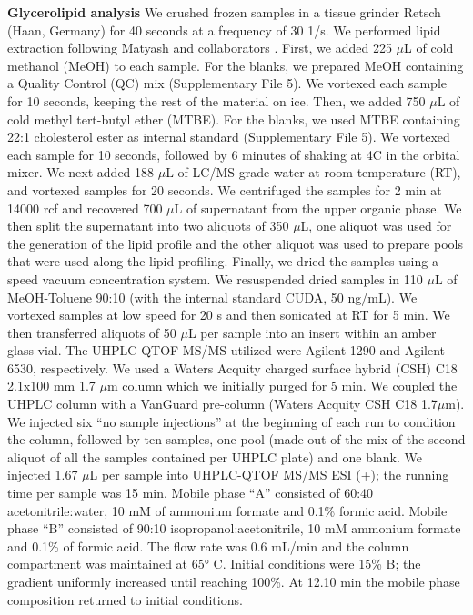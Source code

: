 \documentclass[9pt,twocolumn,twoside,lineno]{BioRxiv}
\begin{document}
\textbf{Glycerolipid analysis} 
We crushed frozen samples in a tissue grinder Retsch (Haan, Germany) for 40 seconds at a frequency of 30 1/s. 
We performed lipid extraction following Matyash and collaborators \cite{Matyash2008-ue}. 
First, we added 225 $\mu$L of cold methanol (MeOH) to each sample. 
For the blanks, we prepared MeOH containing a Quality Control (QC) mix (Supplementary File 5).
We vortexed each sample for 10 seconds, keeping the rest of the material on ice. 
Then, we added 750 $\mu$L of cold methyl tert-butyl ether (MTBE). 
For the blanks, we used MTBE containing 22:1 cholesterol ester as internal standard (Supplementary File 5). 
We vortexed each sample for 10 seconds, followed by 6 minutes of shaking at 4\degree C in the orbital mixer. 
We next added 188 $\mu$L of LC/MS grade water at room temperature (RT), and vortexed samples for 20 seconds.
We centrifuged the samples for 2 min at 14000 rcf and recovered 700 $\mu$L of supernatant from the upper organic phase. 
We then split the supernatant into two aliquots of 350 $\mu$L, one aliquot was used for the generation of the lipid profile and the other aliquot was used to prepare pools that were used along the lipid profiling. 
Finally, we dried the samples using a speed vacuum concentration system.
We resuspended dried samples in 110 $\mu$L of MeOH-Toluene 90:10 (with the internal standard CUDA, 50 ng/mL). 
We vortexed samples at low speed for 20 s and then sonicated at RT for 5 min. 
We then transferred aliquots of 50 $\mu$L per sample into an insert within an amber glass vial.
The UHPLC-QTOF MS/MS utilized were Agilent 1290 and Agilent 6530, respectively. 
We used a Waters Acquity charged surface hybrid (CSH) C18 2.1x100 mm 1.7 $\mu$m column which we initially purged for 5 min. 
We coupled the UHPLC column with a VanGuard pre-column (Waters Acquity CSH C18 1.7$\mu$m). 
We injected six “no sample injections” at the beginning of each run to condition the column, followed by ten samples, one pool (made out of the mix of the second aliquot of all the samples contained per UHPLC plate) and one blank.
We injected 1.67 $\mu$L per sample into UHPLC-QTOF MS/MS ESI (+); the running time per sample was 15 min. 
Mobile phase “A” consisted of 60:40 acetonitrile:water, 10 mM of ammonium formate and 0.1\% formic acid. 
Mobile phase “B” consisted of 90:10 isopropanol:acetonitrile, 10 mM ammonium formate and 0.1\% of formic acid. 
The flow rate was 0.6 mL/min and the column compartment was maintained at 65° C. Initial conditions were 15\% B; the gradient uniformly increased until reaching 100\%. 
At 12.10 min the mobile phase composition returned to initial conditions.
\end{document}
